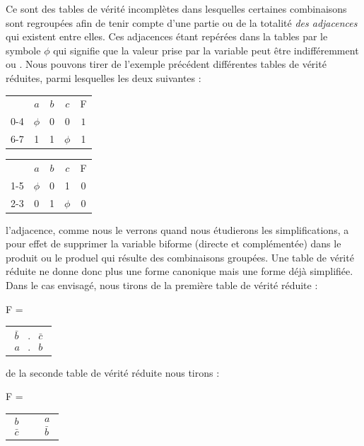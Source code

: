 \textendash{} Ce sont des tables de vérité incomplètes dans lesquelles
certaines combinaisons sont regroupées afin de tenir compte d'une
partie ou de la totalité \emph{des adjacences} qui existent entre
elles. Ces adjacences étant repérées dans la tables par le symbole
\og $\phi$ \fg{} qui signifie que la valeur prise par la variable
peut être indifféremment  \fg{} ou  \fg{}. Nous pouvons
tirer de l'exemple précédent différentes tables de vérité réduites,
parmi lesquelles les deux suivantes : 

\bigskip{}

\hspace*{1cm}%
\begin{tabular}{c|c|c|c||c|}
\cline{2-5} 
 & $a$ & $b$ & $c$ & F\tabularnewline
\cline{2-5} 
0-4 & $\phi$ & 0 & 0 & $1$\tabularnewline
6-7 & 1 & 1 & $\phi$ & 1\tabularnewline
\cline{2-5} 
\end{tabular}\hspace*{\fill}%
\begin{tabular}{c|c|c|c||c|}
\cline{2-5} 
 & $a$ & $b$ & $c$ & F\tabularnewline
\cline{2-5} 
1-5 & $\phi$ & 0 & 1 & 0\tabularnewline
2-3 & 0 & 1 & $\phi$ & 0\tabularnewline
\cline{2-5} 
\end{tabular}\hspace*{1cm}

\bigskip{}

l'adjacence, comme nous le verrons quand nous étudierons les simplifications,
a pour effet de supprimer la variable biforme (directe et complémentée)
dans le produit ou le produel qui résulte des combinaisons groupées.
Une table de vérité réduite ne donne donc plus une forme canonique
mais une forme déjà simplifiée. Dans le cas envisagé, nous tirons
de la première table de vérité réduite :

\bigskip{}

\begin{center}
F = %
\begin{tabular}{|c|}
$\begin{array}{ccc}
\bar{b} & . & \bar{c}\\
a & . & b
\end{array}$\tabularnewline
\end{tabular}
\end{center}

\bigskip{}

de la seconde table de vérité réduite nous tirons :

\begin{center}
F = %
\begin{tabular}{|c|c|}
$\begin{array}{c}
b\\
\bar{c}
\end{array}$ & $\begin{array}{c}
\end{array}$$\begin{array}{c}
a\\
\bar{b}
\end{array}$\tabularnewline
\end{tabular}
\end{center}

